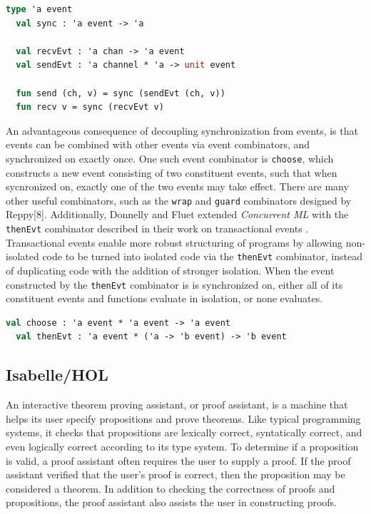 \documentclass[letterpaper, 11pt]{extarticle}
\begin{document}
\begin{lstlisting}[language=ML, mathescape]
  type 'a event
  val sync : 'a event -> 'a

  val recvEvt : 'a chan -> 'a event
  val sendEvt : 'a channel * 'a -> unit event

  fun send (ch, v) = sync (sendEvt (ch, v))
  fun recv v = sync (recvEvt v)
\end{lstlisting}

An advantageous consequence of decoupling synchronization from events, is that events can be
combined with other events via event combinators, and synchronized on exactly once. One such
event combinator is \lstinline{choose}, which constructs a new event consisting of two
constituent events, such that when sycnronized on, exactly one of the two events may take
effect. There are many other useful combinators, such as the \lstinline{wrap} and
\lstinline{guard} combinators designed by Reppy[8]. Additionally, Donnelly and Fluet extended
\textit{Concurrent ML} with the \lstinline{thenEvt} combinator described in their work on
transactional events \cite{donnelly2008transactional}. Transactional events enable more robust
structuring of programs by allowing non-isolated code to be turned into isolated code via
the \lstinline{thenEvt} combinator, instead of duplicating code with the addition of stronger
isolation. When the event constructed by the \lstinline{thenEvt} combinator is is synchronized
on, either all of its constituent events and functions evaluate in isolation, or none
evaluates.

\begin{lstlisting}[language=ML, mathescape]
  val choose : 'a event * 'a event -> 'a event
  val thenEvt : 'a event * ('a -> 'b event) -> 'b event
  \end{lstlisting}


\subsection{Isabelle/HOL}
An interactive theorem proving assistant, or proof assistant, is a machine that helps its user
specify propositions and prove theorems. Like typical programming systems, it checks
that propositions are lexically correct, syntatically correct, and
even logically correct according to its type system. To determine if a proposition is valid, a proof assistant
often requires the user to supply a proof. If the proof assistant verified that the user's proof is correct,
then the proposition may be considered a theorem. In addition to checking the correctness of proofs and
propositions, the proof assistant also assists the user in constructing proofs.
\end{document}
